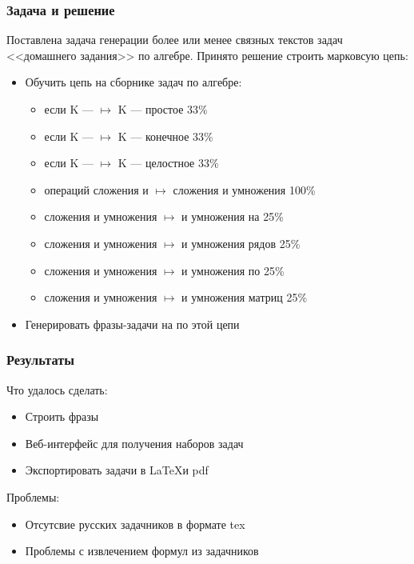 \documentclass[10pt, pdf,utf8,russian]{beamer}
\begin{document}
\begin{frame}
\frametitle{Задача и решение}
Поставлена задача генерации более или менее связных текстов задач <<домашнего задания>> по алгебре.
\newline
\newline
Принято решение строить марковсую цепь:
\begin{itemize}
	\item Обучить цепь на сборнике задач по алгебре:
	\begin{itemize}
		\item если K — $\mapsto$ K — простое  33\%
		\item если K — $\mapsto$ K — конечное  33\%
		\item если K — $\mapsto$ K — целостное  33\%
		\item операций сложения и $\mapsto$ сложения и умножения 100\%
		\item сложения и умножения $\mapsto$ и умножения на 25\%
		\item сложения и умножения $\mapsto$ и умножения рядов 25\%
		\item сложения и умножения $\mapsto$ и умножения по 25\%
		\item сложения и умножения $\mapsto$ и умножения матриц 25\%
	\end{itemize}
	\item Генерировать фразы-задачи на по этой цепи
\end{itemize}
\end{frame}

\begin{frame}
\frametitle{Результаты}
Что удалось сделать:
\begin{itemize}
	\item Строить фразы
	\item Веб-интерфейс для получения наборов задач
	\item Экспортировать задачи в \LaTeX  и pdf
\end{itemize}
Проблемы:
\begin{itemize}
	\item Отсутсвие русских задачников в формате tex
	\item Проблемы с извлечением формул из задачников
\end{itemize}
\end{frame}

\end{document}
